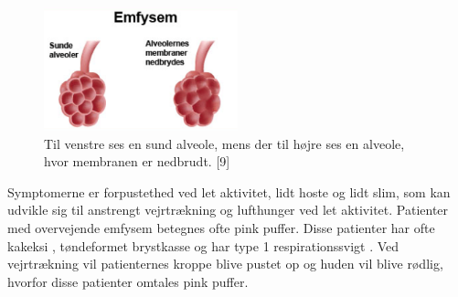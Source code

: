 \begin{figure} [H]
\centering
\includegraphics[width=0.5\textwidth]{figures/emfysem}
\caption{Til venstre ses en sund alveole, mens der til højre ses en alveole, hvor membranen er nedbrudt.  [9]}
\label{fig:emfysem}
\end{figure} 

\noindent
Symptomerne er forpustethed ved let aktivitet, lidt hoste og lidt slim, som kan udvikle sig til anstrengt vejrtrækning og lufthunger ved let aktivitet. Patienter med overvejende emfysem betegnes ofte pink puffer. Disse patienter har ofte kakeksi , tøndeformet brystkasse og har type 1 respirationssvigt . Ved vejrtrækning vil patienternes kroppe blive  pustet op og huden vil blive rødlig, hvorfor disse patienter omtales pink puffer.\cite{Healthguidances2016}




